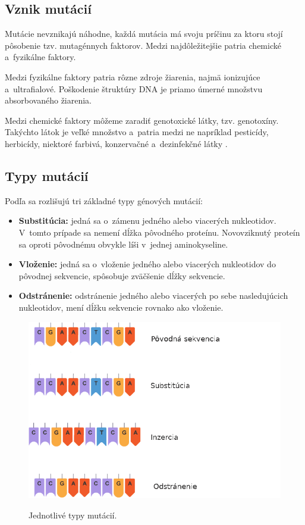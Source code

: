 \subsection{Vznik mutácií}

Mutácie nevznikajú náhodne, každá mutácia má svoju príčinu za ktoru stojí pôsobenie tzv. mutagénnych faktorov. Medzi najdôležitejšie patria chemické a~fyzikálne faktory.

Medzi fyzikálne faktory patria rôzne zdroje žiarenia, najmä ionizujúce a~ultrafialové. Poškodenie štruktúry DNA je priamo úmerné množstvu absorbovaného žiarenia.

Medzi chemické faktory môžeme zaradiť genotoxické látky, tzv. genotoxíny. Takýchto látok je veľké množstvo a~patria medzi ne napríklad pesticídy, herbicídy, niektoré farbivá, konzervačné a~dezinfekčné látky \cite{mutace}. 

\subsection{Typy mutácií}

Podľa \cite{flegr} sa rozlišujú tri základné typy génových mutácií:
\begin{itemize}
	\item \textbf{Substitúcia:} jedná sa o~zámenu jedného alebo viacerých nukleotidov. V~tomto prípade sa nemení dĺžka pôvodného proteínu. Novovziknutý proteín sa oproti pôvodnému obvykle líši v~jednej aminokyseline.
	\item \textbf{Vloženie:} jedná sa o~vloženie jedného alebo viacerých nukleotidov do pôvodnej sekvencie, spôsobuje zväčšenie dĺžky sekvencie.
	\item \textbf{Odstránenie:} odstránenie jedného alebo viacerých po sebe nasledujúcich nukleotidov, mení dĺžku sekvencie rovnako ako vloženie.
\end{itemize}

\begin{figure}[H]
	\centering
	\begin{center}
		\scalebox{0.6}
		{   
			\includegraphics{mutation_types.png}
		}
		\caption[mutacie]{Jednotlivé typy mutácií\footnotemark.}
	\end{center}
\end{figure}

